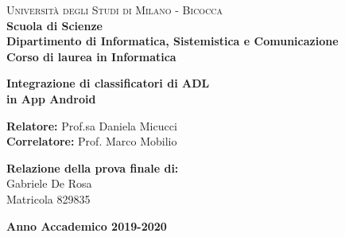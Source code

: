 \begin{titlepage}
        
    \noindent
    \begin{minipage}[t]{0.19\textwidth}
    \end{minipage}
    \begin{minipage}[t]{0.81\textwidth}
    {
            {\textsc{Università degli Studi di Milano - Bicocca}} \\
            \textbf{Scuola di Scienze} \\
            \textbf{Dipartimento di Informatica, Sistemistica e Comunicazione} \\
            \textbf{Corso di laurea in Informatica} \\
            \par
    }
    \end{minipage}
    
\vspace{40mm}
    
\begin{center}
        {\LARGE{
                \textbf{Integrazione di classificatori di ADL \\ in App Android}
                \par
        }}
    \end{center}
    
    \vspace{50mm}

    \noindent
    {\large \textbf{Relatore:} Prof.sa Daniela Micucci } \\

    \noindent
    {\large \textbf{Correlatore:} Prof. Marco Mobilio}
    
    \vspace{15mm}

    \begin{flushright}
        {\large \textbf{Relazione della prova finale di:}} \\
        \large{Gabriele De Rosa} \\
        \large{Matricola 829835} 
    \end{flushright}
    
    \vspace{40mm}
    \begin{center}
        {\large{\bf Anno Accademico 2019-2020}}
    \end{center}

    \restoregeometry
    
\end{titlepage}
